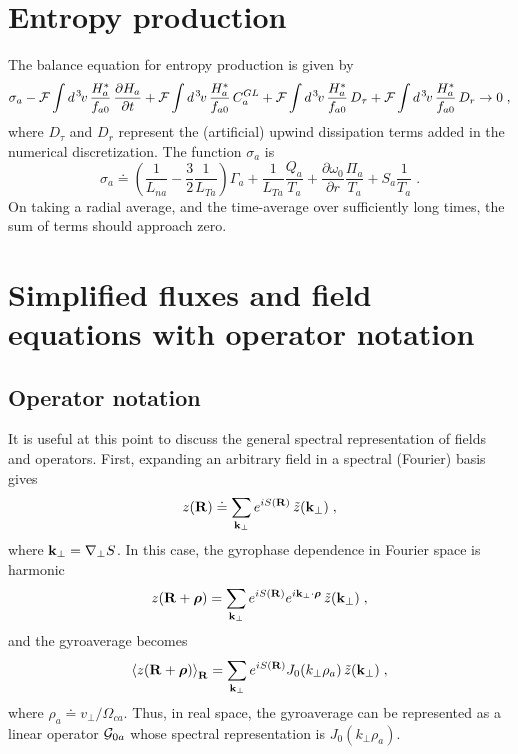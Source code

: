\section{Entropy production}

The balance equation for entropy production is given by
%
\begin{equation}
\sigma_a 
- {\cal F} \int d^{\hskip 1pt 3} \hskip -1pt v \, \frac{H_a^*}{f_{a0}} \, \frac{\partial H_a}{\partial t}  
+ {\cal F} \int d^{\hskip 1pt 3} \hskip -1pt v \, \frac{H_a^*}{f_{a0}} \, C_a^{GL} 
+ {\cal F} \int d^{\hskip 1pt 3} \hskip -1pt v \, \frac{H_a^*}{f_{a0}} \, D_\tau  
+ {\cal F} \int d^{\hskip 1pt 3} \hskip -1pt v \, \frac{H_a^*}{f_{a0}} \, D_r \rightarrow 0 \; ,
\end{equation}
%
where $D_\tau$ and $D_r$ represent the (artificial) upwind dissipation 
terms added in the numerical discretization.  The function $\sigma_a$ 
is
%
\begin{equation}
\sigma_a \doteq
 \left( \frac{1}{L_{na}} - \frac{3}{2} \frac{1}{L_{Ta}} \right) \Gamma_a
+ \frac{1}{L_{Ta}} \frac{Q_a}{T_a} 
+ \frac{\partial\omega_0}{\partial r} \frac{\Pi_a}{T_a}  
+ S_a \frac{1}{T_a} \; .
\end{equation} 
%
On taking a radial average, and the time-average over sufficiently 
long times, the sum of terms should approach zero.

\section{Simplified fluxes and field equations with operator notation}

\subsection{Operator notation}\label{sec.opnotation}

It is useful at this point to discuss the general spectral 
representation of fields and operators.  First, expanding an 
arbitrary field in a spectral (Fourier) basis gives
%
\begin{equation}
z(\mathbf{R}) \doteq \sum_{\mathbf{k}_\perp} e^{iS(\mathbf{R})} \, \tilde{z}(\mathbf{k}_\perp) \; ,
\end{equation}
%
where $\mathbf{k}_\perp = \nabla_\perp S$.  In this case, the gyrophase dependence 
in Fourier space is harmonic
%
\begin{equation}
z(\mathbf{R}+\boldsymbol{\rho}) = \sum_{\mathbf{k}_\perp} e^{iS(\mathbf{R})} e^{i \mathbf{k}_\perp \cdot \boldsymbol{\rho}} 
  \, \tilde{z}(\mathbf{k}_\perp) \; ,
\end{equation}
% 
and the gyroaverage becomes
%
\begin{equation}
\left< z(\mathbf{R}+\boldsymbol{\rho}) \right>_{\mathbf{R}} = \sum_{\mathbf{k}_\perp} e^{iS(\mathbf{R})} J_0 (k_\perp\rho_a) \, \tilde{z}(\mathbf{k}_\perp) \; ,
\end{equation}
%
where $\rho_a \doteq v_\perp/\Omega_{ca}$.  Thus, in real space, the 
gyroaverage can be represented as a linear operator ${\cal G}_{0a}$ whose 
spectral representation is $J_0(k_\perp \rho_a)$.

